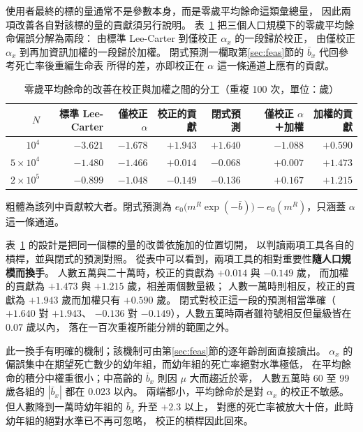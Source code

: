 \documentclass[UTF8, fontset=macnew, a4paper, 12pt]{ctexart}
\begin{document}
使用者最終的標的量通常不是參數本身，而是零歲平均餘命這類彙總量，
因此兩項改善各自對該標的量的貢獻須另行說明。
表~\ref{tab:split} 把三個人口規模下的零歲平均餘命偏誤分解為兩段：
由標準 Lee-Carter 到僅校正 $\alpha_x$ 的一段歸於校正，
由僅校正 $\alpha_x$ 到再加資訊加權的一段歸於加權。
閉式預測一欄取第\ref{sec:feas}節的 $\bar b_x$ 代回參考死亡率後重編生命表
所得的差，亦即校正在 $\alpha$ 這一條通道上應有的貢獻。

\begin{table}[H]
\centering
\caption{零歲平均餘命的改善在校正與加權之間的分工（重複 100 次，單位：歲）}
\small
\begin{tabular}{rrrrrrr}
\toprule
$N$ & 標準 Lee-Carter & 僅校正 $\alpha$ & 校正的貢獻 & 閉式預測
 & \ 僅校正 $\alpha$ ＋加權 & 加權的貢獻\\
\midrule
$10^{4}$          & $-3.621$ & $-1.678$ & $\mathbf{+1.943}$ & $+1.640$ & $-1.088$ & $+0.590$\\
$5\times10^{4}$   & $-1.480$ & $-1.466$ & $+0.014$ & $-0.068$ & $+0.007$ & $\mathbf{+1.473}$\\
$2\times10^{5}$   & $-0.899$ & $-1.048$ & $-0.149$ & $-0.136$ & $+0.167$ & $\mathbf{+1.215}$\\
\bottomrule
\end{tabular}

\vspace{3pt}
{\footnotesize 粗體為該列中貢獻較大者。閉式預測為
$e_0\bigl(m^{R}\exp(-\bar b)\bigr)-e_0(m^{R})$，只涵蓋 $\alpha$ 這一條通道。}
\label{tab:split}
\end{table}

表~\ref{tab:split} 的設計是把同一個標的量的改善依施加的位置切開，
以判讀兩項工具各自的槓桿，並與閉式的預測對照。
從表中可以看到，兩項工具的相對重要性\textbf{隨人口規模而換手}。
人數五萬與二十萬時，校正的貢獻為 $+0.014$ 與 $-0.149$ 歲，
而加權的貢獻為 $+1.473$ 與 $+1.215$ 歲，相差兩個數量級；
人數一萬時則相反，校正的貢獻為 $+1.943$ 歲而加權只有 $+0.590$ 歲。
閉式對校正這一段的預測相當準確（$+1.640$ 對 $+1.943$、
$-0.136$ 對 $-0.149$），人數五萬時兩者雖符號相反但量級皆在 $0.07$ 歲以內，
落在一百次重複所能分辨的範圍之外。

此一換手有明確的機制；該機制可由第\ref{sec:feas}節的逐年齡剖面直接讀出。
$\alpha_x$ 的偏誤集中在期望死亡數少的幼年組，而幼年組的死亡率絕對水準極低，
在平均餘命的積分中權重很小；中高齡的 $\bar b_x$ 則因 $\mu$ 大而趨近於零，
人數五萬時 60 至 99 歲各組的 $|\bar b_x|$ 都在 $0.023$ 以內。
兩端都小，平均餘命於是對 $\alpha_x$ 的校正不敏感。
但人數降到一萬時幼年組的 $\bar b_x$ 升至 $+2.3$ 以上，
對應的死亡率被放大十倍，此時幼年組的絕對水準已不再可忽略，
校正的槓桿因此回來。
\end{document}
